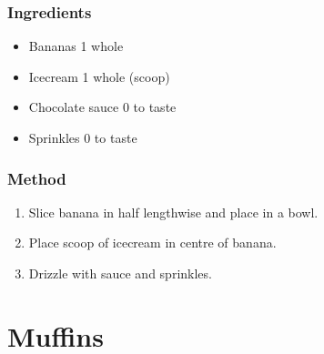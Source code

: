 \documentclass[]{article}
\begin{document}
\subsubsection*{\Large Ingredients}
\begin{multicols}{2}
\begin{itemize}
 \item Bananas \hfill 1 whole
 \item Icecream \hfill 1 whole (scoop)
 \item Chocolate sauce \hfill 0 to taste
 \item Sprinkles \hfill 0 to taste
\end{itemize}
\end{multicols}
\subsubsection*{\Large Method}
\begin{enumerate}[font=\huge\color{accent}]
	\item Slice banana in half lengthwise and place in a bowl.
	\item Place scoop of icecream in centre of banana.
	\item Drizzle with sauce and sprinkles.
\end{enumerate}
\newpage
{}
\section*{\center\Huge\color{accent}Muffins}
\label{cat:Muffins}
\label{rec:Apple Cinnamon Muffins}
\end{document}
